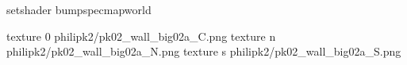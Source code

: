 setshader bumpspecmapworld

texture 0 philipk2/pk02_wall_big02a_C.png
texture n philipk2/pk02_wall_big02a_N.png
texture s philipk2/pk02_wall_big02a_S.png

